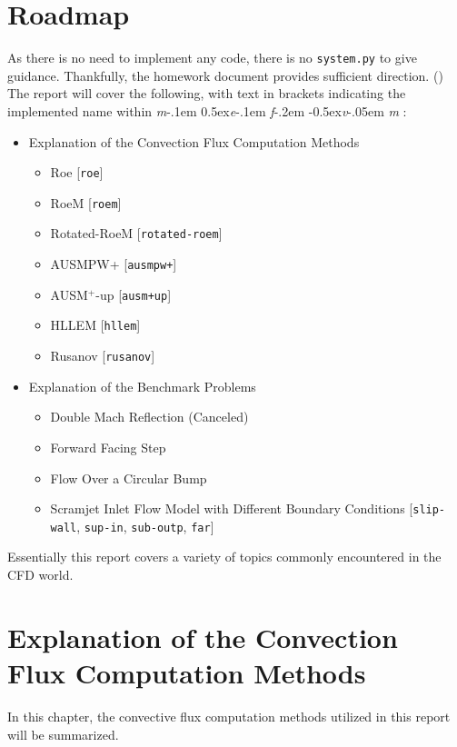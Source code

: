 \documentclass[a4paper, 12pt]{article}
\newcommand\mefvm{%
    \textit{m}\kern-.1em%
    \raise0.5ex\hbox{\textit{e}}\kern-.1em%
    \textit{f}\kern-.2em%
    \raise-0.5ex\hbox{\textit{v}}\kern-.05em%
    \textit{m}
}
\begin{document}
\section{Roadmap}
As there is no need to implement any code, there is no \verb|system.py| to give guidance. Thankfully, the homework document provides sufficient direction. (\cite{lect}) The report will cover the following, with text in brackets indicating the implemented name within \mefvm:
\begin{itemize}
    \item Explanation of the Convection Flux Computation Methods
    \begin{itemize}
        \item Roe [\verb|roe|]
        \item RoeM [\verb|roem|]
        \item Rotated-RoeM [\verb|rotated-roem|]
        \item AUSMPW+ [\verb|ausmpw+|]
        \item AUSM$^+$-up [\verb|ausm+up|]
        \item HLLEM [\verb|hllem|]
        \item Rusanov [\verb|rusanov|]
    \end{itemize}
    \item Explanation of the Benchmark Problems
    \begin{itemize}
        \item Double Mach Reflection (Canceled)
        \item Forward Facing Step
        \item Flow Over a Circular Bump
        \item Scramjet Inlet Flow Model with Different Boundary Conditions [\verb|slip-wall|, \verb|sup-in|, \verb|sub-outp|, \verb|far|]
    \end{itemize}
\end{itemize} \par
Essentially this report covers a variety of topics commonly encountered in the CFD world.
\section{Explanation of the Convection Flux Computation Methods}
In this chapter, the convective flux computation methods utilized in this report will be summarized. 
\end{document}
